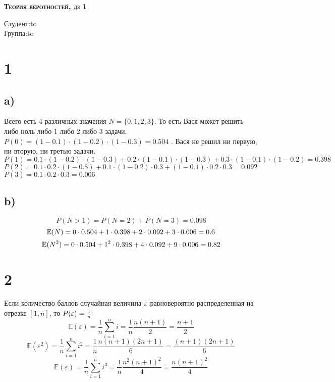 
	
\begin{titlepage}

	
	\begin{center}
		\textsc{\textbf{Теория веротностей, дз 1}}
	\end{center}
	
	\vspace{6em}
	
	
	
	\newbox{\lbox}
	\newlength{\maxl}
	\setlength{\maxl}{\wd\lbox}
	\hfill\parbox{11cm}{
		\hspace*{5cm}\hspace*{-5cm}Студент:\hfill\hbox to\\
		\hspace*{5cm}\hspace*{-5cm}Группа:\hfill\hbox to\\
		}
	
	
	
\end{titlepage}

	\section*{1}
	\subsection*{a)}
	Всего есть 4 различных значения $N = \{0,1,2,3\}$. То есть Вася может решить либо ноль либо 1 либо 2 либо 3 задачи. \\
	$P(0) = (1-0.1)\cdot(1-0.2)\cdot(1-0.3) = 0.504$ . Вася не решил ни первую, ни вторую, ни третью задачи. \\
	$P(1) = 0.1\cdot(1-0.2)\cdot(1-0.3)+0.2\cdot(1-0.1)\cdot(1-0.3) + 0.3\cdot(1-0.1)\cdot(1-0.2) = 0.398 $ \\
	$P(2) = 0.1\cdot0.2\cdot(1-0.3)+ 0.1\cdot(1-0.2)\cdot0.3+ (1-0.1)\cdot0.2\cdot0.3 =0.092$ \\
	$P(3) = 0.1\cdot0.2\cdot0.3 = 0.006$
	\subsection*{b)}
		$$P(N>1) = P(N=2)+P(N=3) = 0.098$$
		$$\mathbb{E}(N) = 0\cdot0.504+ 1\cdot0.398+2\cdot0.092+3\cdot0.006 = 0.6$$	
		$$\mathbb{E}(N^2) = 0\cdot0.504+ 1^2\cdot0.398+ 4\cdot0.092+9\cdot0.006 =0.82 $$
	\section*{2}
	Если количество баллов случайная величина $\varepsilon$ равновероятно распределенная на отрезке $\left[ 1,n\right] $, то $P(\varepsilon) = \frac1n$ \\
	$$\mathbb{E}(\varepsilon) = \frac{1}{n}\sum^n_{i=1}i = \frac{1}{n}\frac{n(n+1)}{2} = \frac{n+1}{2}$$
	$$\mathbb{E}(\varepsilon^2) = \frac{1}{n}\sum^n_{i=1}i^2 = \frac{1}{n}\frac{n(n+1)(2n+1)}{6} = \frac{(n+1)(2n+1)}{6}$$
	$$\mathbb{E}(\varepsilon) = \frac{1}{n}\sum^n_{i=1}i^3 = \frac{1}{n}\frac{n^2(n+1)^2}{4} = \frac{n(n+1)^2}{4}$$
